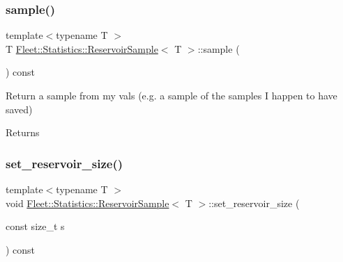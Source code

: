 \mbox{\label{class_fleet_1_1_statistics_1_1_reservoir_sample_a1b66a8f27512ebd6a48370621a43db87}} 
\subsubsection{\texorpdfstring{sample()}{sample()}}
{\footnotesize\ttfamily template$<$typename T $>$ \\
T \hyperlink{class_fleet_1_1_statistics_1_1_reservoir_sample}{Fleet\+::\+Statistics\+::\+Reservoir\+Sample}$<$ T $>$\+::sample (\begin{DoxyParamCaption}{ }\end{DoxyParamCaption}) const\hspace{0.3cm}{\ttfamily [inline]}}

Return a sample from my vals (e.\+g. a sample of the samples I happen to have saved) \begin{DoxyReturn}{Returns}

\end{DoxyReturn}
\mbox{\label{class_fleet_1_1_statistics_1_1_reservoir_sample_adabe7f40c91657950a67df7d20ace543}} 
\subsubsection{\texorpdfstring{set\+\_\+reservoir\+\_\+size()}{set\_reservoir\_size()}}
{\footnotesize\ttfamily template$<$typename T $>$ \\
void \hyperlink{class_fleet_1_1_statistics_1_1_reservoir_sample}{Fleet\+::\+Statistics\+::\+Reservoir\+Sample}$<$ T $>$\+::set\+\_\+reservoir\+\_\+size (\begin{DoxyParamCaption}\item[{const size\+\_\+t}]{s }\end{DoxyParamCaption}) const\hspace{0.3cm}{\ttfamily [inline]}}

